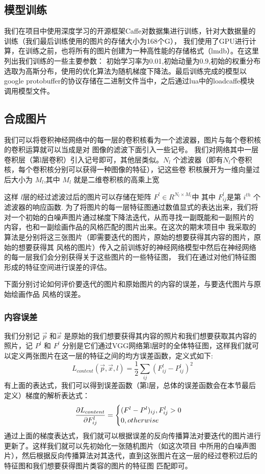 \documentclass[10pt,a4paper]{ctexart}
\begin{document}
    \subsection{模型训练}
    我们在项目中使用深度学习的开源框架Caffe对数据集进行训练，针对大数据量的训练（我们最后训练使用的图片的存储大小为168个G），
    我们使用了GPU进行计算，在训练之前，也将所有的图片创建为一种高性能的存储格式（lmdb）。在这里列出我们训练的一些主要参数：
    初始学习率为0.01,初始动量为0.9,初始的权重分布选取为高斯分布，使用的优化算法为随机梯度下降法。最后训练完成的模型以
    google protobuffer的协议存储在二进制文件当中，之后通过lua中的loadcaffe模块调用模型文件。
    \subsection{合成图片}
    我们可以将卷积神经网络中的每一层的卷积核看为一个滤波器，图片与每个卷积核的卷积运算就可以当成是对
    图像的滤波下面引入一些记号。
    我们对网络其中一层卷积层（第l层卷积）引入记号即可，其他层类似。$N_l$ 个滤波器（即有$N_l$个卷积核，每个卷积核分别可以获得一种图像的特征），记这些卷
    积核展开为一维向量过后大小为 $M_l$,其中 $M_l$ 就是二维卷积核的高乘上宽
	
    这样 $l$层的经过滤波过后的图片可以存储在矩阵  $F^l \in R^{N_l\times M_l}$中 其中 $F_{ij}^{l}$是第
	 $i^{th}$ 个滤波器的响应函数.
     为了将图片的每一层特征图通过数值显式的表达出来，我们将对一个初始的白噪声图片通过梯度下降法迭代，从而寻找一副既能和一副照片的
     内容，也和一副绘画作品的风格匹配的图片出来。在这次的期末项目中
     我采取的算法是分别将这三张图片（即需要迭代的图片，原始的想要获得其内容的图片，原始的想要获得其
     风格的图片）传入之前训练好的神经网络模型中然后在神经网络的每一层我们会分别获得关于这些图片的一些特征图，
     我们在通过对他们特征图形成的特征空间进行误差的评估。
     
     下面分别讨论如何评价要迭代的图片和原始图片的内容的误差，与要迭代图片与原始绘画作品
     风格的误差。
     \subsubsection{内容误差}
	我们分别记 $\overrightarrow{p}$ 和$\overrightarrow{x}$ 是原始的我们想要获得其内容的照片和我们想要获取其内容的照片，记  $P^l$ 和 $F^l$ 分别是它们通过VGG网络第l层时的全体特征图，这样我们就可以定义两张图片在这一层的特征之间的均方误差函数，定义式如下:
	\begin{equation}
	L_{content} (\overrightarrow{p},\overrightarrow{x},l)= \frac{1}{2} \sum_{ij}
	(F_{ij}^{l}-P_{ij}^{l})^2
	\end{equation}
    有上面的表达式，我们可以得到误差函数（第l层，总体的误差函数会在本节最后定义）梯度的解析表达式：
	\begin{eqnarray}
	\dfrac{\partial L_{content}}{\partial F_{ij}^l}=\begin{cases}
	(F^l-P^l)_{ij} ,F_{ij}^l>0 \cr 0,otherwise
	\end{cases}
	\end{eqnarray}
	通过上面的梯度表达式，我们就可以根据误差的反向传播算法对要迭代的图片进行更新了。这样我们就可以先初始化一张随机图片（如这次项目
    中所用的白噪声图片），然后根据反向传播算法对其迭代，直到这张图片在这一层的经过卷积过后的特征图和我们想要获得图片类容的图片的特征图
    匹配即可。
	
\end{document}
